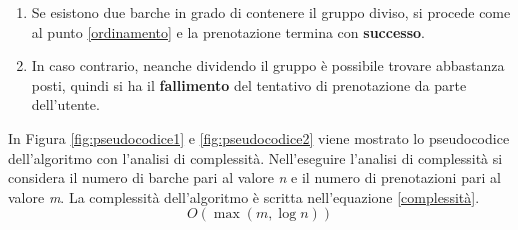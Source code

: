 \begin{enumerate}
    \begin{enumerate}
        \item Se esistono due barche in grado di contenere il gruppo diviso, si procede come al punto \ref{ordinamento} e la prenotazione termina con \textbf{successo}.
        \item In caso contrario, neanche dividendo il gruppo è possibile trovare abbastanza posti, quindi si ha il \textbf{fallimento} del tentativo di prenotazione da parte dell'utente. 
    \end{enumerate}
\end{enumerate}

In Figura \ref{fig:pseudocodice1} e \ref{fig:pseudocodice2} viene mostrato lo pseudocodice dell'algoritmo con l'analisi di complessità. Nell'eseguire l'analisi di complessità si considera il numero di barche pari al valore \textit{n} e il numero di prenotazioni pari al valore \textit{m}. La complessità dell'algoritmo è scritta nell'equazione \ref{complessità}. 
\begin{equation}
O(\max{(m,\log{n})})
\label{complessità}
\end{equation}

